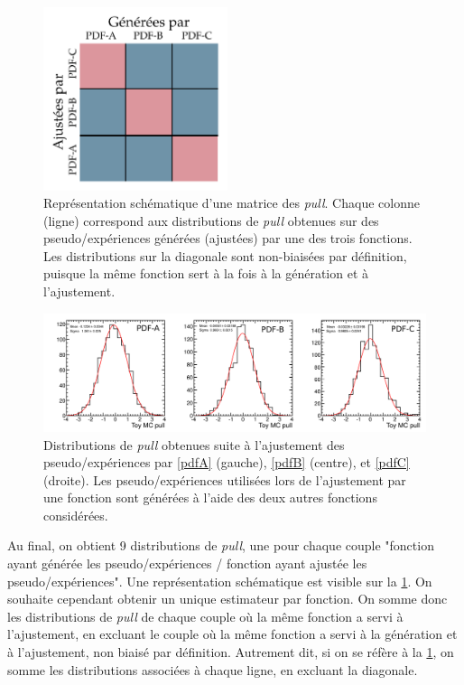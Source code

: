 \begin{figure}[tbp]
  \centering
  \includegraphics[width=0.48\textwidth]{chapitre7/figs/pull_matrix.pdf}
  \caption{Représentation schématique d'une matrice des \emph{pull}. Chaque colonne (ligne) correspond aux distributions de \emph{pull} obtenues sur des pseudo\-/expériences générées (ajustées) par une des trois fonctions. Les distributions sur la diagonale sont non-biaisées par définition, puisque la même fonction sert à la fois à la génération et à l'ajustement.}
  \label{fig:pull_matrix}
\end{figure}

\begin{figure}[tbp]
  \centering
  \includegraphics[width=\textwidth]{chapitre7/figs/alterfit_750.pdf}
  \caption{Distributions de \emph{pull} obtenues suite à l'ajustement des pseudo\-/expériences par \ref{pdfA} (gauche), \ref{pdfB} (centre), et \ref{pdfC} (droite). Les pseudo\-/expériences utilisées lors de l'ajustement par une fonction sont générées à l'aide des deux autres fonctions considérées.}
  \label{fig:pulls}
\end{figure}

Au final, on obtient 9 distributions de \emph{pull}, une pour chaque couple "fonction ayant générée les pseudo\-/expériences / fonction ayant ajustée les pseudo\-/expériences". Une représentation schématique est visible sur la \cref{fig:pull_matrix}. On souhaite cependant obtenir un unique estimateur par fonction. On somme donc les distributions de \emph{pull} de chaque couple où la même fonction a servi à l'ajustement, en excluant le couple où la même fonction a servi à la génération et à l'ajustement, non biaisé par définition. Autrement dit, si on se réfère à la \cref{fig:pull_matrix}, on somme les distributions associées à chaque ligne, en excluant la diagonale.

